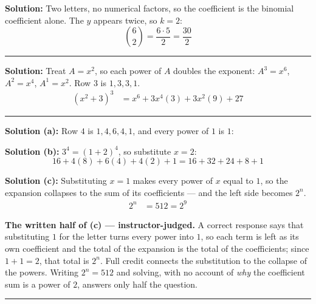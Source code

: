 \documentclass[12pt]{article}
\begin{document}

\textbf{Solution:} Two letters, no numerical factors, so the coefficient is the binomial
coefficient alone. The $y$ appears twice, so $k = 2$:
\[ \binom{6}{2} = \frac{6 \cdot 5}{2} = \frac{30}{2} \]

\vspace{0.2cm}\noindent\rule{\linewidth}{0.2pt}


\textbf{Solution:} Treat $A = x^2$, so each power of $A$ doubles the exponent: $A^3 = x^6$,
$A^2 = x^4$, $A^1 = x^2$. Row $3$ is $1, 3, 3, 1$.
\begin{align*}
  (x^2 + 3)^3 &= x^6 + 3x^4(3) + 3x^2(9) + 27
\end{align*}

\vspace{0.2cm}\noindent\rule{\linewidth}{0.2pt}


\textbf{Solution (a):} Row $4$ is $1, 4, 6, 4, 1$, and every power of $1$ is $1$:

\textbf{Solution (b):} $3^4 = (1 + 2)^4$, so substitute $x = 2$:
\[ 16 + 4(8) + 6(4) + 4(2) + 1 = 16 + 32 + 24 + 8 + 1 \]

\textbf{Solution (c):} Substituting $x = 1$ makes every power of $x$ equal to $1$, so the
expansion collapses to the sum of its coefficients --- and the left side becomes $2^n$.
\begin{align*}
  2^n &= 512 = 2^9
\end{align*}

\vspace{0.1cm}
\textbf{The written half of (c) --- instructor-judged.} A correct response says that
substituting $1$ for the letter turns every power into $1$, so each term is left as its own
coefficient and the total of the expansion is the total of the coefficients; since
$1 + 1 = 2$, that total is $2^n$. Full credit connects the substitution to the collapse of
the powers. Writing $2^n = 512$ and solving, with no account of \emph{why} the coefficient
sum is a power of $2$, answers only half the question.

\vspace{0.2cm}\noindent\rule{\linewidth}{0.2pt}
\end{document}

